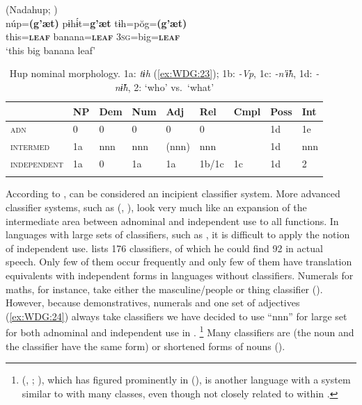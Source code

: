 \documentclass[output=collectionpaper]{langsci/langscibook}
\begin{document}
\ea\label{ex:WDG:23}
 (Nadahup; \citealt[278]{Epps2008})\\
\gll núp=\textbf{(g'æt)}	pɨhɨ́t=\textbf{g'æt}	tɨh=pŏg=\textbf{(g'æt)}\\
this=\textbf{\textsc{leaf}}	banana=\textbf{\textsc{leaf}}	3\textsc{sg}=big=\textbf{\textsc{leaf}}\\
\glt `this big banana leaf'\\
\z

\begin{table}
\caption{Hup nominal morphology. 1a: \textit{tɨh} (\ref{ex:WDG:23}); 1b: \textit{-Vp}, 1c: \textit{-n’ɨ̆h}, 1d: \textit{-nɨ̆h}, 2: ‘who’ vs.\ ‘what’\label{tab:WDG:5}}
\begin{tabular}{>{\scshape}l*{8}{l}}
\lsptoprule
&	NP	&	Dem	&	Num	&	Adj	&	Rel	&	Cmpl	&	Poss	&	Int	\\
\midrule
adn	&	0	&	0	&	0	&	0	&	0	&		&	1d	&	1e	\\
intermed	&	1a	&	nnn	&	nnn	&	(nnn)	&	nnn	&		&	1d	&	nnn	\\
independent	&	1a	&	0	&	1a	&	1a	&	1b/1c	&	1c	&	1d	&	2	\\
\lspbottomrule
\end{tabular}
\end{table}

According to \cite[279]{Epps2008},  can be considered an incipient classifier system. More advanced classifier systems, such as  (, ), look very much like an expansion of the intermediate area between adnominal and independent use to all functions. In languages with large sets of classifiers, such as , it is difficult to apply the notion of independent use. \cite[81]{Senft1986} lists 176 classifiers, of which he could find 92 in actual speech. Only few of them occur frequently and only few of them have translation equivalents with independent forms in languages without classifiers. Numerals for maths, for instance, take either the masculine/people or thing classifier (\citealt[84]{Senft1986}). However, because demonstratives, numerals and one set of adjectives (\ref{ex:WDG:24}) always take classifiers we have decided to use ``nnn'' for large set for both adnominal and independent use in .%
\footnote{%
 (, ; \citealt{Kayser1993}), which has figured prominently in (\citealt[167]{Dixon1982}), is another  language with a system similar to  with many classes, even though not closely related to  within .
} %
Many classifiers are  (the noun and the classifier have the same form) or shortened forms of nouns (\citealt[104]{Senft1993}).
\end{document}
